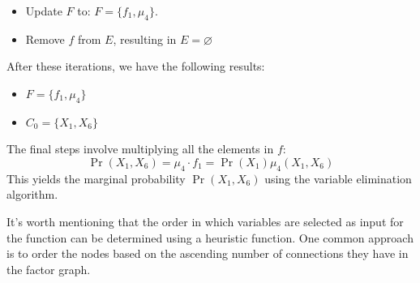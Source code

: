 \begin{example}
\begin{itemize}
\begin{itemize}
                \item Update $F$ to: $F=\{f_1,\mu_4\}$. 
                \item Remove $f$ from $E$, resulting in $E=\varnothing$
            \end{itemize}
    \end{itemize}
    After these iterations, we have the following results:
    \begin{itemize}
        \item $F=\{f_1,\mu_4\}$
        \item $C_0=\{X_1,X_6\}$
    \end{itemize}
    The final steps involve multiplying all the elements in $f$: 
    \[\Pr(X_1,X_6)=\mu_4 \cdot f_1=\Pr(X_1)\mu_4(X_1,X_6)\]
    This yields the marginal probability $\Pr(X_1,X_6)$ using the variable elimination algorithm.
\end{example}
It's worth mentioning that the order in which variables are selected as input for the function can be determined using a heuristic function. 
One common approach is to order the nodes based on the ascending number of connections they have in the factor graph.
